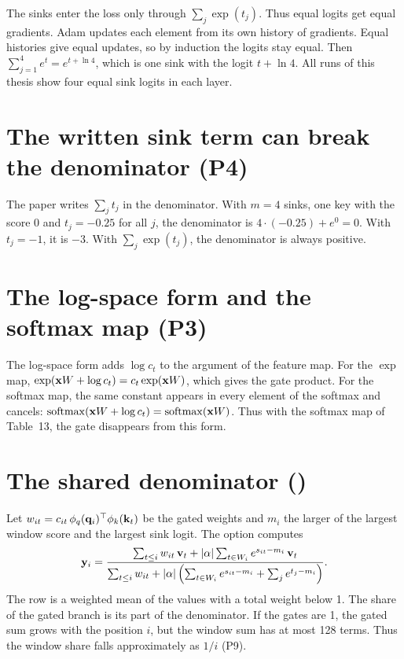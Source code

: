 The sinks enter the loss only through $\sum_j \exp(t_j)$. Thus equal logits get equal gradients. Adam updates each element from its own history of gradients. Equal histories give equal updates, so by induction the logits stay equal. Then $\sum_{j=1}^{4} e^{t} = e^{t + \ln 4}$, which is one sink with the logit $t + \ln 4$. All runs of this thesis show four equal sink logits in each layer.

\section{The written sink term can break the denominator (P4)}

The paper writes $\sum_j t_j$ in the denominator. With $m = 4$ sinks, one key with the score 0 and $t_j = -0.25$ for all $j$, the denominator is $4 \cdot (-0.25) + e^0 = 0$. With $t_j = -1$, it is $-3$. With $\sum_j \exp(t_j)$, the denominator is always positive.

\section{The log-space form and the softmax map (P3)}

The log-space form adds $\log c_t$ to the argument of the feature map. For the $\exp$ map, $\exp(\mathbf{x} W + \log c_t) = c_t \exp(\mathbf{x} W)$, which gives the gate product. For the softmax map, the same constant appears in every element of the softmax and cancels: $\mathrm{softmax}(\mathbf{x} W + \log c_t) = \mathrm{softmax}(\mathbf{x} W)$. Thus with the softmax map of Table~13, the gate disappears from this form.

\section{The shared denominator ()}

Let $w_{it} = c_{it}\,\phi_q(\mathbf{q}_i)^\top\phi_k(\mathbf{k}_t)$ be the gated weights and $m_i$ the larger of the largest window score and the largest sink logit. The option  computes
\begin{equation}
\mathbf{y}_i = \frac{\sum_{t \le i} w_{it}\, \mathbf{v}_t + |\alpha| \sum_{t \in W_i} e^{s_{it} - m_i}\, \mathbf{v}_t}{\sum_{t \le i} w_{it} + |\alpha| \left( \sum_{t \in W_i} e^{s_{it} - m_i} + \sum_j e^{t_j - m_i} \right)} .
\end{equation}
The row is a weighted mean of the values with a total weight below 1. The share of the gated branch is its part of the denominator. If the gates are 1, the gated sum grows with the position $i$, but the window sum has at most 128 terms. Thus the window share falls approximately as $1/i$ (P9).

